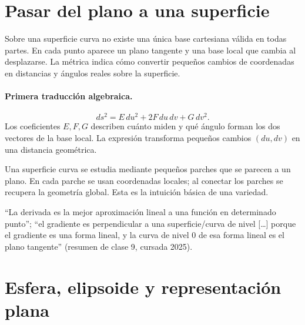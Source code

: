 \section{Pasar del plano a una superficie}\label{cap:06}\label{sec:plano-superficie}

{\small\vspace{1mm}\par}


Sobre una superficie curva no existe una única base cartesiana válida en todas partes. En
cada punto aparece un plano tangente y una base local que cambia al desplazarse. La métrica
indica cómo convertir pequeños cambios de coordenadas en distancias y ángulos reales sobre
la superficie.

\paragraph{Primera traducción algebraica.}
\[
  ds^2=E\,du^2+2F\,du\,dv+G\,dv^2.
\]
Los coeficientes \(E,F,G\) describen cuánto miden y qué ángulo forman los dos vectores de la
base local. La expresión transforma pequeños cambios \((du,dv)\) en una distancia geométrica.

\begin{idea}
Una superficie curva se estudia mediante pequeños parches que se parecen a un plano. En cada
parche se usan coordenadas locales; al conectar los parches se recupera la geometría global.
Esta es la intuición básica de una variedad.
\end{idea}

\begin{idea}
``La derivada es la mejor aproximación lineal a una función en determinado punto''; ``el
gradiente es perpendicular a una superficie/curva de nivel [\ldots] porque el gradiente es
una forma lineal, y la curva de nivel 0 de esa forma lineal es el plano tangente'' (resumen de clase 9, cursada 2025).
\end{idea}

\section{Esfera, elipsoide y representación plana}\label{sec:esfera-primera}

{\small\vspace{1mm}\par}
{\small\vspace{1mm}\par}


